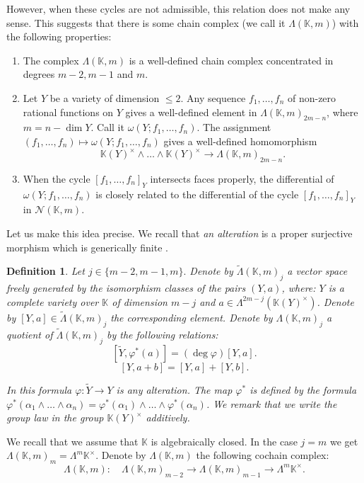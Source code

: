 \documentclass[12pt]{extarticle}
\newtheorem{definition}[theorem]{Definition}
\def\mb{\mathbb}
\def\mc{\mathcal}
\def\L{\Lambda}
\def\k{\mb K}
\def\ph{\varphi}
\def\t{\times}
\def\wt{\widetilde}
\def\wdw{\wedge\dots\wedge}
\begin{document}
However, when these cycles are not admissible, this relation does not make any sense. This suggests that there is some chain complex (we call it $\L(\k,m)$) with the following properties:
\begin{enumerate}
    \item The complex $\L(\k,m)$ is a well-defined chain complex concentrated in degrees $m-2,m-1$ and $m$.
    \item Let $Y$ be a variety of dimension $\leq 2$. Any sequence $f_1,\dots, f_n$ of non-zero rational functions on $Y$ gives a well-defined element in $\L(\k,m)_{2m-n}$, where $m=n-\dim Y$. Call it $\omega(Y;f_1,\dots, f_n)$. The assignment $(f_1,\dots, f_n)\mapsto \omega(Y;f_1,\dots, f_n)$ gives a well-defined homomorphism
    $$\k(Y)^\times\wedge\dots\wedge \k(Y)^\times\to \L(\k,m)_{2m-n}.$$
    \item When the cycle $[f_1,\dots, f_n]_Y$ intersects faces properly, the differential of $\omega(Y;f_1,\dots, f_n)$ is closely related to the differential of the cycle $[f_1,\dots, f_n]_Y$ in $\mc N(\k,m)$.
\end{enumerate}

 Let us make this idea precise. We recall that \emph{an alteration} is a proper surjective morphism which is generically finite \cite[Introduction]{de1996smoothness}.


    \begin{definition} 
    Let $j\in \{m-2,m-1,m\}.$ Denote by $\wt\L(\k, m)_j$  a vector space freely generated by the isomorphism classes of the pairs $(Y, a)$, where: $Y$ is a complete variety over $\k$ of dimension $m-j$ and $a\in\Lambda^{2m-j}(\k(Y)^\t)$. Denote by $[Y,a]\in\wt\L(\k,m)_j$ the corresponding element.
Denote by $\L(\k, m)_j$ a quotient of $\wt\L(\k, m)_j$ by the following relations:
$$[\wt Y,\ph^*(a)]=(\deg\ph)[Y,a].$$
$$[Y,a+b]=[Y, a] + [Y, b].$$

In this formula $\ph\colon \wt Y\to Y$ is any alteration. The map $\ph^*$ is defined by the formula
$\ph^*(\alpha_1\wdw \alpha_n)=\ph^*(\alpha_1)\wdw \ph^*(\alpha_n)$. We remark that we write the group law in the group $\k(Y)^\t$ additively. %
\end{definition}

We recall that we assume that $\k$ is algebraically closed. In the case $j=m$ we get $\Lambda(\k,m)_m=\Lambda^m\k^\times$. Denote by $\Lambda(
\k,m
)$ the following cochain complex:
$$\Lambda(\k,m)\colon\quad \Lambda(\k,m)_{m-2}\to \Lambda(\k,m)_{m-1}\to \Lambda^m\k^\times.$$
\end{document}
